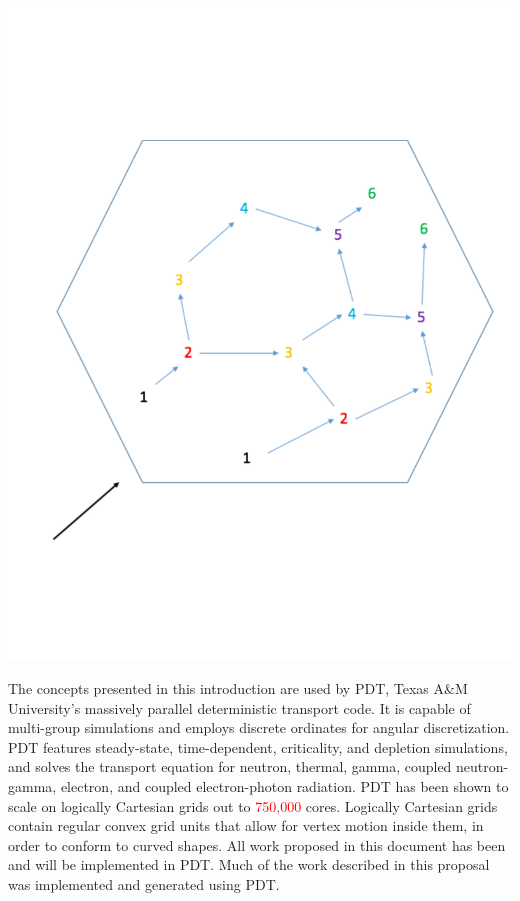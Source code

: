 \documentclass[11pt, letterpaper,titlepage,oneside]{article}
\newcommand{\tcr}[1]{\textcolor{red}{#1}}
\begin{document}
\noindent\begin{minipage}{\textwidth}
\centering
\includegraphics[scale = 0.5]{../figures/tdg.pdf}
\label{tdg}
\end{minipage}
\smallskip

The concepts presented in this introduction are used by PDT, Texas A\&M University's massively parallel deterministic transport code. It is capable of multi-group simulations and employs discrete ordinates for angular discretization. PDT features steady-state, time-dependent, criticality, and depletion simulations, and solves the transport equation for neutron, thermal, gamma, coupled neutron-gamma, electron, and coupled electron-photon radiation. PDT  has been shown to scale on logically Cartesian grids out to \tcr{750,000} cores. Logically Cartesian grids contain regular convex grid units that allow for vertex motion inside them, in order to conform to curved shapes. All work proposed in this document has been and will be implemented in PDT. Much of the work described in this proposal was implemented and generated using PDT.
\end{document}

